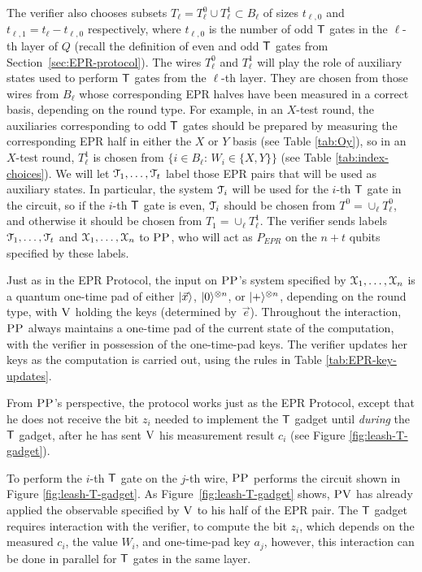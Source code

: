 The verifier also chooses subsets $T_\ell = T_\ell^0 \cup T_\ell^1 \subset B_\ell$ of sizes $t_{\ell,0}$ and $t_{\ell,1} = t_\ell-t_{\ell,0}$ respectively, where $t_{\ell,0}$ is the number of odd $\sf T$ gates in the $\ell$-th layer of $Q$ (recall the definition of even and odd $\sf T$ gates from Section~\ref{sec:EPR-protocol}). The wires $T^0_\ell$ and $T^1_\ell$ will play the role of auxiliary states used to perform $\sf T$ gates from the $\ell$-th layer. They are chosen from those wires from $B_\ell$ whose corresponding EPR halves have been measured in a correct basis, depending on the round type.  For example, in an $X$-test round, the auxiliaries corresponding to odd $\sf T$ gates should be prepared by measuring the corresponding EPR half in either the $X$ or $Y$ basis (see Table \ref{tab:Oy}), so in an $X$-test round, $T_\ell^1$ is chosen from $\{i\in B_\ell:\,W_i\in \{X,Y\}\}$ (see Table \ref{tab:index-choices}). We will let ${\cal T}_1,\dots,{\cal T}_t$ label those EPR pairs that will be used as auxiliary states. In particular, the system ${\cal T}_i$ will be used for the $i$-th $\sf T$ gate in the circuit, so if the $i$-th $\sf T$ gate is even, ${\cal T}_i$ should be chosen from $T^0=\cup_\ell T_\ell^0$, and otherwise it should be chosen from $T_1=\cup_\ell T_\ell^1$. The verifier sends labels ${\cal T}_1,\dots,{\cal T}_t$ and ${\cal X}_1,\dots,{\cal X}_n$ to $\textsc{PP}$, who will act as $P_{EPR}$ on the $n+t$ qubits specified by these labels.


Just as in the EPR Protocol, the input on $\textsc{PP}$'s system specified by ${\cal X}_1,\dots,{\cal X}_n$ is a quantum one-time pad of either $|\vec{x}\rangle$, $|0\rangle^{\otimes n}$, or $|+\rangle^{\otimes n}$, depending on the round type, with $\textsc{V}$ holding the keys (determined by~$\vec{e}$). Throughout the interaction, $\textsc{PP}$ always maintains a one-time pad of the current state of the computation, with the verifier in possession of the one-time-pad keys. The verifier updates her keys as the computation is carried out, using the rules in Table \ref{tab:EPR-key-updates}. 




From $\textsc{PP}$'s perspective, the protocol works just as the EPR Protocol, except that he does not receive the bit $z_i$ needed to implement the $\sf T$ gadget until \emph{during} the $\sf T$ gadget, after he has sent $\textsc{V}$ his measurement result $c_i$ (see Figure \ref{fig:leash-T-gadget}).


 
To perform the $i$-th $\sf T$ gate on the $j$-th wire, $\textsc{PP}$ performs the circuit shown in Figure \ref{fig:leash-T-gadget}. As Figure~\ref{fig:leash-T-gadget} shows, $\textsc{PV}$ has already applied the observable specified by $\textsc{V}$ to his half of the EPR pair. The $\sf T$ gadget requires interaction with the verifier, to compute the bit $z_i$, which depends on the measured $c_i$, the value $W_i$, and one-time-pad key $a_j$, however, this interaction can be done in parallel for $\sf T$ gates in the same layer. 





